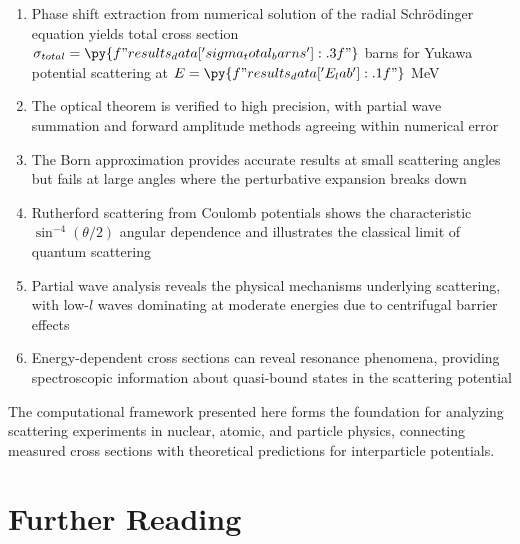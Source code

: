 \documentclass[a4paper, 11pt]{article}
\begin{document}
\begin{enumerate}
\item Phase shift extraction from numerical solution of the radial Schrödinger equation yields
total cross section $\sigma_{total} = \py{f"{results_data['sigma_total_barns']:.3f}"}$ barns
for Yukawa potential scattering at $E = \py{f"{results_data['E_lab']:.1f}"}$ MeV

\item The optical theorem is verified to high precision, with partial wave summation and forward
amplitude methods agreeing within numerical error

\item The Born approximation provides accurate results at small scattering angles but fails at
large angles where the perturbative expansion breaks down

\item Rutherford scattering from Coulomb potentials shows the characteristic $\sin^{-4}(\theta/2)$
angular dependence and illustrates the classical limit of quantum scattering

\item Partial wave analysis reveals the physical mechanisms underlying scattering, with low-$l$
waves dominating at moderate energies due to centrifugal barrier effects

\item Energy-dependent cross sections can reveal resonance phenomena, providing spectroscopic
information about quasi-bound states in the scattering potential
\end{enumerate}

The computational framework presented here forms the foundation for analyzing scattering experiments
in nuclear, atomic, and particle physics, connecting measured cross sections with theoretical
predictions for interparticle potentials.

\section*{Further Reading}
\end{document}
